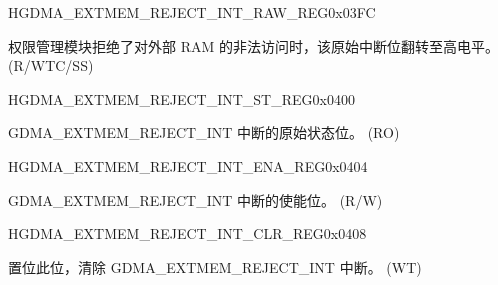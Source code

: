 \begin{register}{H}{GDMA\_EXTMEM\_REJECT\_INT\_RAW\_REG}{0x{}03FC}\label{regdesc:DMAEXTMEMREJECTINTRAWREG}
%
%
\regnewline%
\begin{regdesc}\begin{reglist}
\label{fielddesc:DMAEXTMEMREJECTINTRAW}\item [GDMA\_EXTMEM\_REJECT\_INT\_RAW] 权限管理模块拒绝了对外部 RAM 的非法访问时，该原始中断位翻转至高电平。 (R/WTC/SS)
\end{reglist}\end{regdesc}
\end{register}


\begin{register}{H}{GDMA\_EXTMEM\_REJECT\_INT\_ST\_REG}{0x{}0400}\label{regdesc:DMAEXTMEMREJECTINTSTREG}
%
%
\regnewline%
\begin{regdesc}\begin{reglist}
\label{fielddesc:DMAEXTMEMREJECTINTST}\item [GDMA\_EXTMEM\_REJECT\_INT\_ST] GDMA\_EXTMEM\_REJECT\_INT 中断的原始状态位。 (RO)
\end{reglist}\end{regdesc}
\end{register}


\begin{register}{H}{GDMA\_EXTMEM\_REJECT\_INT\_ENA\_REG}{0x{}0404}\label{regdesc:DMAEXTMEMREJECTINTENAREG}
%
%
\regnewline%
\begin{regdesc}\begin{reglist}
\label{fielddesc:DMAEXTMEMREJECTINTENA}\item [GDMA\_EXTMEM\_REJECT\_INT\_ENA] GDMA\_EXTMEM\_REJECT\_INT 中断的使能位。 (R/W)
\end{reglist}\end{regdesc}
\end{register}


\begin{register}{H}{GDMA\_EXTMEM\_REJECT\_INT\_CLR\_REG}{0x{}0408}\label{regdesc:DMAEXTMEMREJECTINTCLRREG}
%
%
\regnewline%
\begin{regdesc}\begin{reglist}
\label{fielddesc:DMAEXTMEMREJECTINTCLR}\item [GDMA\_EXTMEM\_REJECT\_INT\_CLR] 置位此位，清除 GDMA\_EXTMEM\_REJECT\_INT 中断。 (WT)
\end{reglist}\end{regdesc}
\end{register}


